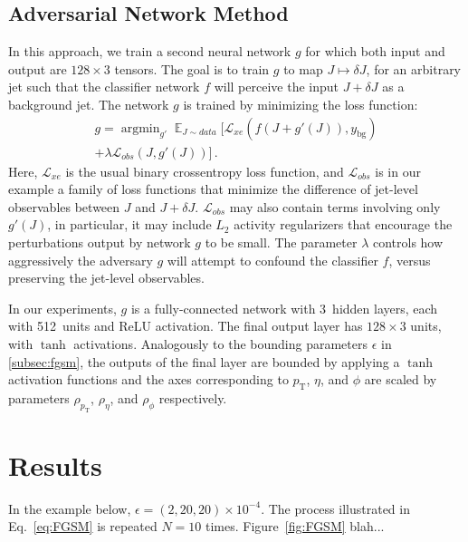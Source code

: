 \documentclass[reprint,nofootinbib,...]{revtex4-1}
\DeclareMathOperator*{\argmin}{argmin}
\DeclareMathOperator*{\E}{\mathbb{E}}
\newcommand{\nconst}{128}       %
\newcommand{\nlayerADV}{3}
\newcommand{\nunitsADV}{512}
\newcommand{\pt}{p_\mathrm{T}} %
\begin{document}
\subsection{Adversarial Network Method}

In this approach, we train a second neural network $g$ for which both input and output are $\nconst\times 3$ tensors.
The goal is to train $g$ to map $J\mapsto\delta J$, for an arbitrary jet such that the classifier network $f$ will perceive the input $J+\delta J$ as a background jet.
The network $g$ is trained by minimizing the loss function:
\begin{multline}
g = \argmin_{g'}\E_{J\sim data} [ \mathcal{L}_{xe}(f(J+g'(J)), y_\mathrm{bg}) \\ + \lambda\mathcal{L}_{obs}(J, g'(J))] \,.
\end{multline}
Here, $\mathcal{L}_{xe}$ is the usual binary crossentropy loss function, and $\mathcal{L}_{obs}$ is in our example a family of loss functions that minimize the difference of jet-level observables between $J$ and $J+\delta J$.
$\mathcal{L}_{obs}$ may also contain terms involving only $g'(J)$, in particular, it may include $L_2$ activity regularizers that encourage the perturbations output by network $g$ to be small.
The parameter $\lambda$ controls how aggressively the adversary $g$ will attempt to confound the classifier $f$, versus preserving the jet-level observables.

In our experiments, $g$ is a fully-connected network with \nlayerADV\ hidden layers, each with \nunitsADV\ units and ReLU activation.
The final output layer has $\nconst\times 3$ units, with $\tanh$ activations.
Analogously to the bounding parameters $\epsilon$ in \ref{subsec:fgsm}, the outputs of the final layer are bounded by applying a $\tanh$ activation functions and the axes corresponding to $\pt$, $\eta$, and $\phi$ are scaled by parameters $\rho_{\pt}$, $\rho_\eta$, and $\rho_\phi$ respectively.



\section{Results}

In the example below, $\epsilon=(2,20,20)\times 10^{-4}$.  The process illustrated in Eq.~\ref{eq:FGSM} is repeated $N=10$ times.  Figure~\ref{fig:FGSM} blah...
\end{document}
